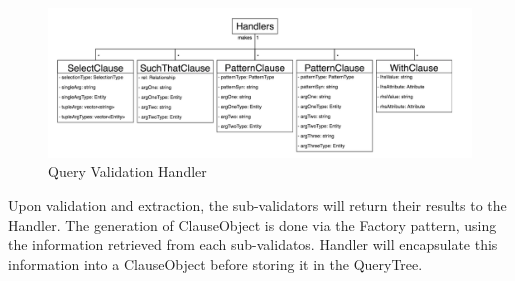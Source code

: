 \documentclass[12pt]{article}
\begin{document}
{{{{{{{{{{{{{
\begin{figure}[H]
  \caption{Query Validation Handler}
 \includegraphics[width=1.1\textwidth]{ClauseInteraction.png}
\end{figure}
Upon validation and extraction, the sub-validators will return their results to the Handler. The generation of ClauseObject is done via the Factory pattern, using the information retrieved from each sub-validatos. Handler will encapsulate this information into a ClauseObject before storing it in the QueryTree.

}}}}}}}}}}}}}
\end{document}
